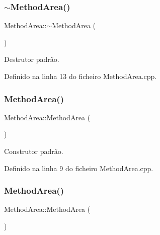 \subsubsection{\texorpdfstring{$\sim$\+Method\+Area()}{~MethodArea()}}
{\footnotesize\ttfamily Method\+Area\+::$\sim$\+Method\+Area (\begin{DoxyParamCaption}{ }\end{DoxyParamCaption})}



Destrutor padrão. 



Definido na linha 13 do ficheiro Method\+Area.\+cpp.

\mbox{\label{classMethodArea_a6e9aac39975424e6c0ab3c29535aca75}} 
\subsubsection{\texorpdfstring{Method\+Area()}{MethodArea()}\hspace{0.1cm}{\footnotesize\ttfamily [1/2]}}
{\footnotesize\ttfamily Method\+Area\+::\+Method\+Area (\begin{DoxyParamCaption}{ }\end{DoxyParamCaption})\hspace{0.3cm}{\ttfamily [private]}}



Construtor padrão. 



Definido na linha 9 do ficheiro Method\+Area.\+cpp.

\mbox{\label{classMethodArea_a3a51cf2f998faa40ff46f17019f59e0a}} 
\subsubsection{\texorpdfstring{Method\+Area()}{MethodArea()}\hspace{0.1cm}{\footnotesize\ttfamily [2/2]}}
{\footnotesize\ttfamily Method\+Area\+::\+Method\+Area (\begin{DoxyParamCaption}\item[{\hyperlink{classMethodArea}{Method\+Area} const \&}]{ }\end{DoxyParamCaption})\hspace{0.3cm}{\ttfamily [private]}}



